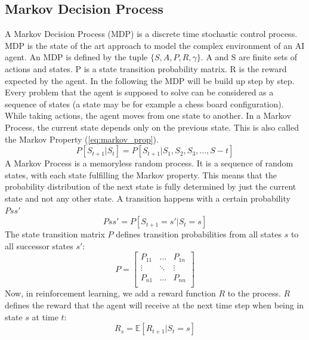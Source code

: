 \documentclass[12pt,a4paper]{article}
\begin{document}
\subsection{Markov Decision Process}
A Markov Decision Process (MDP) is a discrete time stochastic control process. MDP is the state of the art approach to model the complex environment of an AI agent. An MDP is defined by the tuple ${\{S, A, P, R, \gamma\}}$. A and S are finite sets of actions and states. P is a state transition probability matrix. R is the reward expected by the agent. In the following the MDP will be build up step by step. \newline
Every problem that the agent is supposed to solve can be considered as a sequence of states (a state may be for example a chess board configuration). While taking actions, the agent moves from one state to another. In a Markov Process, the current state depends only on the previous state. This is also called the Markov Property (\ref{eq:markov_prop}).
\begin{equation}
    \label{eq:markov_prop}
    P[S_{t+1}|S_t] = P[S_{t+1}|S_1,S_2,S_3,...,S-t]
\end{equation}
A Markov Process is a memoryless random process. It is a sequence of random states, with each state fulfilling the Markov property. This means that the probability distribution of the next state is fully determined by just the current state and not any other state. A transition happens with a certain probability ${Pss'}$
\begin{equation}
    \label{eq:trans_prob}
    Pss' = P[S_{t+1} = s' | S_t =s]
\end{equation}
The state transition matrix ${P}$ defines transition probabilities from all states $s$ to all successor states ${s'}$:
\begin{equation}
    \label{eq:trans_matrix}
    P = \begin{bmatrix}
        P_{11} & \dots & P_{1n}\\
        \vdots & \ddots & \vdots\\
        P_{n1} & \dots & P_{nn}\\
    \end{bmatrix}
\end{equation}
Now, in reinforcement learning, we add a reward function ${R}$ to the process.  ${R}$ defines the reward that the agent will receive at the next time step when being in state $s$ at time $t$:
\begin{equation}
    \label{eq:reward_func}
    R_s = \mathbb{E}[R_{t+1}|S_t = s]
\end{equation}
\end{document}
